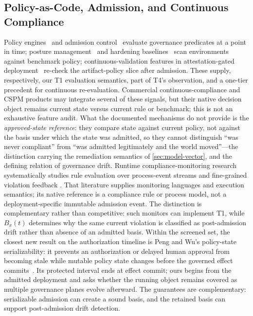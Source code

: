 \subsection{Policy-as-Code, Admission, and Continuous Compliance}
Policy engines~\cite{opa,kyverno} and admission
control~\cite{k8sadmission} evaluate governance predicates at a point in
time; posture management~\cite{cspm} and hardening baselines~\cite{nsacisa2022}
scan environments against benchmark policy; continuous-validation features in
attestation-gated deployment~\cite{binauthz} re-check the artifact-policy
slice after admission. These supply, respectively, our T1 evaluation
semantics, part of T4's observation, and a one-tier precedent for continuous
re-evaluation. Commercial continuous-compliance and CSPM products may
integrate several of these signals, but their native decision object remains
current state versus current rule or benchmark; this is not an exhaustive
feature audit. What the documented mechanisms do not provide is the
\emph{approved-state reference}:
they compare state against current policy, not against the basis under which
the state was admitted, so they cannot distinguish ``was never compliant''
from ``was admitted legitimately and the world moved''---the distinction
carrying the remediation semantics of \cref{sec:model-vector}, and the
defining relation of governance drift.
Runtime compliance-monitoring research systematically studies rule
evaluation over process-event streams and fine-grained violation feedback
\cite{ly2015compliance}. That literature supplies monitoring languages and
execution semantics; its native reference is a compliance rule or process
model, not a deployment-specific immutable admission event. The distinction
is complementary rather than competitive: such monitors can implement T1,
while $B_x(t)$ determines why the same current violation is classified as
post-admission drift rather than absence of an admitted basis.
Within the screened set, the closest new result on the authorization timeline
is Peng and Wu's policy-state serializability: it prevents an authorization or
delayed human approval from becoming stale while mutable policy state changes
before the governed effect commits~\cite{peng2026stateful}. Its protected interval ends at
effect commit; ours begins from the admitted deployment and asks whether the
running object remains covered as multiple governance planes evolve afterward.
The guarantees are complementary: serializable admission can create a sound
basis, and the retained basis can support post-admission drift detection.


